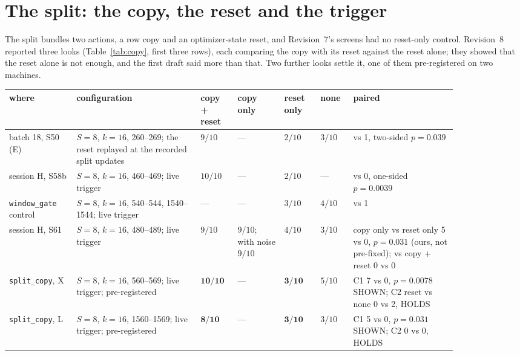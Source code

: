 \documentclass[11pt]{article}
\begin{document}
\section{The split: the copy, the reset and the trigger}
\label{sec:split}

The split bundles two actions, a row copy and an optimizer-state reset, and Revision~7's screens had no reset-only control. Revision~8 reported three looks (Table~\ref{tab:copy}, first three rows), each comparing the copy with its reset against the reset alone; they showed that the reset alone is not enough, and the first draft said more than that. Two further looks settle it, one of them pre-registered on two machines.

\begin{table}[H]
\centering
\footnotesize
\setlength{\tabcolsep}{3pt}
\begin{tabular}{@{}>{\raggedright\arraybackslash}p{0.13\linewidth}>{\raggedright\arraybackslash}p{0.24\linewidth}>{\centering\arraybackslash}p{0.07\linewidth}>{\centering\arraybackslash}p{0.09\linewidth}>{\centering\arraybackslash}p{0.07\linewidth}>{\centering\arraybackslash}p{0.06\linewidth}>{\raggedright\arraybackslash}p{0.2\linewidth}@{}}
\toprule
where & configuration & copy + reset & copy only & reset only & none & paired\\
\midrule
batch 18, S50 (E) & $S{=}8$, $k{=}16$, 260--269; the reset replayed at the recorded split updates & $9/10$ & --- & $2/10$ & $3/10$ & 8 vs 1, two-sided $p = 0.039$\\
session H, S58b & $S{=}8$, $k{=}16$, 460--469; live trigger & $10/10$ & --- & $2/10$ & --- & 8 vs 0, one-sided $p = 0.0039$\\
\texttt{window\_gate} control & $S{=}8$, $k{=}16$, 540--544, 1540--1544; live trigger & --- & --- & $3/10$ & $4/10$ & 0 vs 1\\
session H, S61 & $S{=}8$, $k{=}16$, 480--489; live trigger & $9/10$ & $9/10$; with noise $9/10$ & $4/10$ & $3/10$ & copy only vs reset only 5 vs 0, $p = 0.031$ (ours, not pre-fixed); vs copy + reset 0 vs 0\\
\texttt{split\_copy}, X & $S{=}8$, $k{=}16$, 560--569; live trigger; pre-registered & $\mathbf{10/10}$ & --- & $\mathbf{3/10}$ & $5/10$ & C1 7 vs 0, $p = 0.0078$ SHOWN; C2 reset vs none 0 vs 2, HOLDS\\
\texttt{split\_copy}, L & $S{=}8$, $k{=}16$, 1560--1569; live trigger; pre-registered & $\mathbf{8/10}$ & --- & $\mathbf{3/10}$ & $3/10$ & C1 5 vs 0, $p = 0.031$ SHOWN; C2 0 vs 0, HOLDS\\

\end{tabular}
\end{table}
\end{document}
